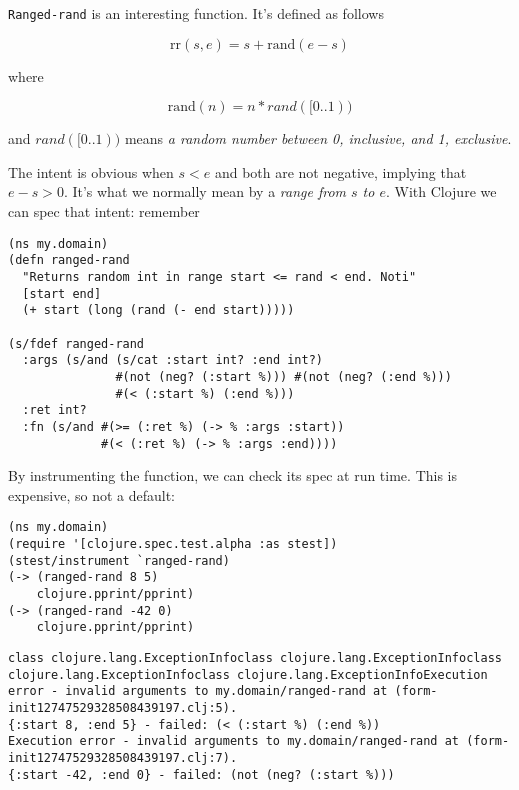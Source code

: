 \documentclass[10pt,oneside,x11names]{article}
\begin{document}
\texttt{Ranged-rand} is an interesting function. It's defined as follows

\begin{equation}
  \textrm{rr}(s, e) = s + \textrm{rand}(e - s)
\end{equation}

where

\begin{equation}
  \textrm{rand}(n) = n * rand( [0..1) )
\end{equation}

and \(rand( [0..1) )\) means \emph{a random number between 0, inclusive, and 1, exclusive}.

The intent is obvious when \(s<e\) and both are not negative, implying that \(e - s
> 0\). It's what we normally mean by a \emph{range from \(s\) to \(e\)}. With Clojure we
can spec that intent: remember

\begin{verbatim}
(ns my.domain)
(defn ranged-rand
  "Returns random int in range start <= rand < end. Noti"
  [start end]
  (+ start (long (rand (- end start)))))

(s/fdef ranged-rand
  :args (s/and (s/cat :start int? :end int?)
               #(not (neg? (:start %))) #(not (neg? (:end %)))
               #(< (:start %) (:end %)))
  :ret int?
  :fn (s/and #(>= (:ret %) (-> % :args :start))
             #(< (:ret %) (-> % :args :end))))
\end{verbatim}

By instrumenting the function, we can check its spec at run time. This is
expensive, so not a default:

\begin{verbatim}
(ns my.domain)
(require '[clojure.spec.test.alpha :as stest])
(stest/instrument `ranged-rand)
(-> (ranged-rand 8 5)
    clojure.pprint/pprint)
(-> (ranged-rand -42 0)
    clojure.pprint/pprint)
\end{verbatim}

\begin{verbatim}
class clojure.lang.ExceptionInfoclass clojure.lang.ExceptionInfoclass clojure.lang.ExceptionInfoclass clojure.lang.ExceptionInfoExecution error - invalid arguments to my.domain/ranged-rand at (form-init12747529328508439197.clj:5).
{:start 8, :end 5} - failed: (< (:start %) (:end %))
Execution error - invalid arguments to my.domain/ranged-rand at (form-init12747529328508439197.clj:7).
{:start -42, :end 0} - failed: (not (neg? (:start %)))
\end{verbatim}
\end{document}
